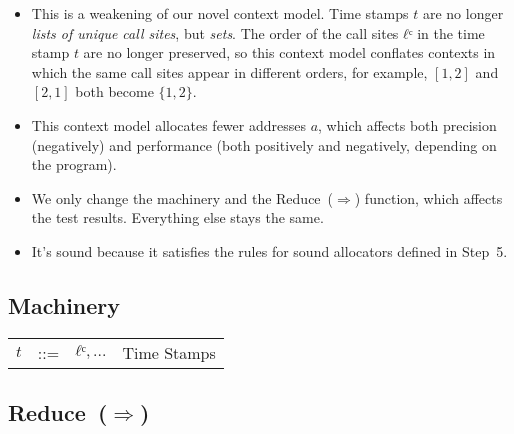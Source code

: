 \documentclass[12pt, oneside]{book}
\begin{document}
\begin{itemize}
  \item This is a weakening of our novel context model. Time stamps \(t\) are no longer \emph{lists of unique call sites}, but \emph{sets}. The order of the call sites \(ℓᶜ\) in the time stamp \(t\) are no longer preserved, so this context model conflates contexts in which the same call sites appear in different orders, for example, \([1, 2]\) and \([2, 1]\) both become \(\{1, 2\}\).
  \item This context model allocates fewer addresses \(a\), which affects both precision (negatively) and performance (both positively and negatively, depending on the program).
  \item We only change the machinery and the Reduce~(\(⇒\)) function, which affects the test results. Everything else stays the same.
  \item It’s sound because it satisfies the rules for sound allocators defined in Step~5.
\end{itemize}

\subsection{Machinery}

\begin{tabular}{rcll}
  \(t\) & ::= & \({ℓᶜ, ...}\) & Time Stamps \\
\end{tabular}

\subsection{Reduce~(\(⇒\))}
\end{document}
